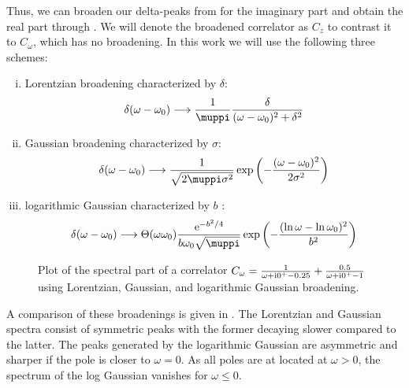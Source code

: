 Thus, we can broaden our delta-peaks from 
for the imaginary part and obtain the real part through .
We will denote the broadened correlator as $C_z$
to contrast it to $C_\omega$, which has no broadening.
In this work we will use the following three schemes:
\begin{enumerate}[(i)]
    \item Lorentzian broadening characterized by $\delta$:
          \label{item:lorentzian}
          \begin{equation}
              \delta(\omega - \omega_0)
              \longrightarrow
              \frac{1}{\muppi}\frac{\delta}{(\omega - \omega_0)^2 + \delta^2}
          \end{equation}
    \item Gaussian broadening characterized by $\sigma$:
          \label{item:gaussian}
          \begin{equation}
              \delta(\omega - \omega_0)
              \longrightarrow
              \frac{1}{\sqrt{2\muppi \sigma^2}}\exp\left(-\frac{(\omega - \omega_0)^2}{2\sigma^2}\right)
          \end{equation}
    \item logarithmic Gaussian characterized by $b$ \cite{Bulla2008}:
          \label{item:logarithmic-gaussian}
          \begin{equation}
              \delta(\omega - \omega_0)
              \longrightarrow
              \Theta(\omega\omega_0)\frac{\me^{-b^2/4}}{b\omega_0\sqrt{\muppi}}\exp\left(-\frac{(\ln\omega-\ln\omega_0)^2}{b^2}\right)
          \end{equation}
\end{enumerate}

\begin{figure}[ht]
    \centering
    
    \caption{
        Plot of the spectral part of a correlator
        $C_\omega = \frac{1}{\omega + \mathrm{i}0^+ - 0.25} + \frac{0.5}{\omega + \mathrm{i}0^+ - 1}$
        using Lorentzian, Gaussian, and logarithmic Gaussian broadening.
    }
    \label{fig:broadening}
\end{figure}

A comparison of these broadenings is given in .
The Lorentzian and Gaussian spectra consist of symmetric peaks
with the former decaying slower compared to the latter.
The peaks generated by the logarithmic Gaussian are asymmetric
and sharper if the pole is closer to $\omega=0$.
As all poles are at located at $\omega>0$,
the spectrum of the log Gaussian vanishes for $\omega\le0$.


